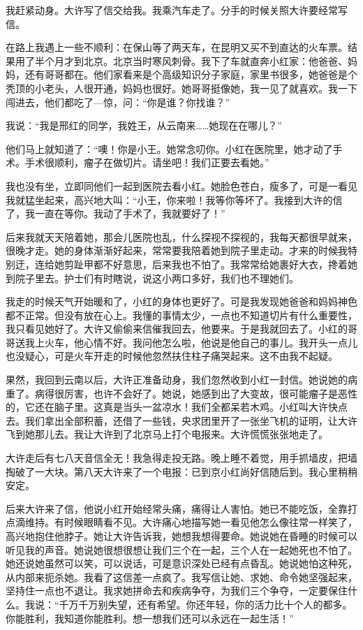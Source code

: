 我赶紧动身。大许写了信交给我。我乘汽车走了。分手的时候关照大许要经常写信。 

在路上我遇上一些不顺利：在保山等了两天车，在昆明又买不到直达的火车票。结果用了半个月才到北京。北京当时寒风刺骨。我下了车就直奔小红家：他爸爸、妈妈，还有哥哥都在。他们家看来是个高级知识分子家庭，家里书很多，她爸爸是个秃顶的小老头，人很开通，妈妈也很好。她哥哥挺像她，我一见了就喜欢。我一下闯进去，他们都吃了—惊，问：“你是谁？你找谁？”　 

我说：“我是邢红的同学，我姓王，从云南来……她现在在哪儿？” 

他们马上就知道了：“噢！你是小王。她常念叨你。小红在医院里，她才动了手术。手术很顺利，瘤子在做切片。请坐吧！我们正要去看她。” 

我也没有坐，立即同他们一起到医院去看小红。她脸色苍白，瘦多了，可是一看见我就猛坐起来，高兴地大叫：“小王，你来啦！我等你等坏了。我接到大许的信了，我一直在等你。我动了手术了，我就要好了！” 

后来我就天天陪着她，那会儿医院也乱，什么探视不探视的，我每天都很早就来，很晚才走。她的身体渐渐好起来，常常要我陪着她到院子里走动。才来的时候我特别迂，连给她剪趾甲都不好意思，后来我也不怕了。我常常给她裹好大衣，搀着她到院子里去。护士们有时瞎说，说这小两口多好，我们也不理她们。 

我走的时候天气开始暖和了，小红的身体也更好了。可是我发现她爸爸和妈妈神色都不正常。但没有放在心上。我懂的事情太少，一点也不知道切片有什么重要性，我只看见她好了。大许又偷偷来信催我回去，他要来。于是我就回去了。小红的哥哥送我上火车，他心情不好。我问他怎么啦，他说是他自己的事儿。我开头一点儿也没疑心，可是火车开走的时候他忽然扶住柱子痛哭起来。这不由我不起疑。 

果然，我回到云南以后，大许正准备动身，我们忽然收到小红一封信。她说她的病重了。病得很厉害，也许不会好了。她说，她感到出了大变故，很可能瘤子是恶性的，它还在脑子里。这真是当头一盆凉水！我们全都呆若木鸡。小红叫大许快点去。我们拿出全部积蓄，还借了一些钱，央求团里开了一张坐飞机的证明，让大许飞到她那儿去。我让大许到了北京马上打个电报来。大许慌慌张张地走了。 

大许走后有七八天音信全无！我急得走投无路。晚上睡不着觉，用手抓墙皮，把墙掏破了一大块。第八天大许来了一个电报：已到京小红尚好信随后到。我心里稍稍安定。 

后来大许来了信，他说小红开始经常头痛，痛得让人害怕。她已不能吃饭，全靠打点滴维持。有时候眼睛看不见。大许痛心地描写她一看见他怎么像往常一样笑了，高兴地抱住他脖子。她让大许告诉我，她想我想得要命。她说她在昏睡的时候可以听见我的声音。她说她很想很想让我们三个在一起，三个人在一起她死也不怕了。她还说她虽然可以笑，可以说话，可是意识深处已经有点昏乱。她说她怕这种死，从内部来扼杀她。我看了这信差一点疯了。我写信让她、求她、命令她坚强起来，坚持住一点也不退让。我求她拼命去和疾病争夺，为我们三个争夺，一定要保住什么。我说：“千万千万别失望，还有希望。你还年轻，你的活力比十个人的都多。你能胜利，我知道你能胜利。想一想我们还可以永远在一起生活！” 

